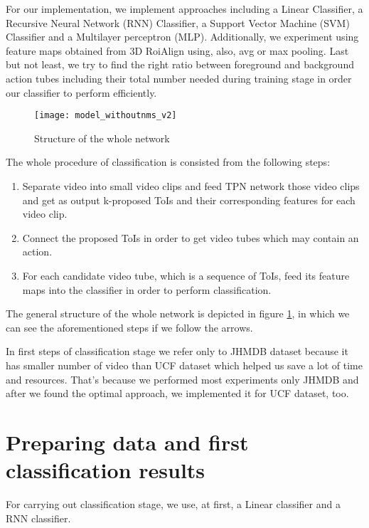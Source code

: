 For our implementation, we implement approaches including a Linear Classifier, 
a Recursive Neural Network (RNN) Classifier, a Support Vector Machine (SVM) Classifier and a Multilayer perceptron (MLP).
Additionally, we experiment using feature maps obtained from 3D RoiAlign using, also, avg or max pooling. Last but not least, we try to
find the right ratio between foreground and background action tubes including their total number needed during training stage
in order our classifier to perform efficiently.

\begin{figure}[h]
  \centering
  \texttt{[image: model\_withoutnms\_v2]}
  \caption{Structure of the whole network}
  \label{fig:whole_network}
\end{figure}

The whole procedure of classification is consisted from the following steps:
\begin{enumerate}
\item Separate video into small video clips and feed TPN network those video clips and get as output
  k-proposed ToIs and their corresponding features for each video clip.
\item Connect the proposed ToIs in order to get video tubes which may contain an action.
\item For each candidate video tube, which is a sequence of ToIs, feed its feature maps  into the classifier
  in order to perform classification.
\end{enumerate}

The general structure of the whole network is depicted in figure \ref{fig:whole_network}, in which we can see the aforementioned steps if we
follow the arrows.  \par
In first steps of classification stage we refer only to JHMDB dataset because it has smaller number of video than UCF dataset which
helped us save a lot of time and resources. That's because  we performed most experiments only JHMDB and after we found the optimal
approach, we implemented it for  UCF dataset, too. 

\section{Preparing data  and first classification results}

For carrying out classification stage, we use, at first, a Linear classifier and a RNN classifier.
